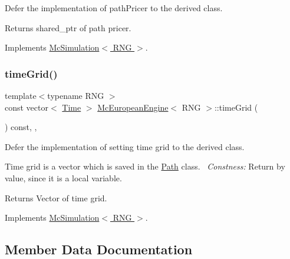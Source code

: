 Defer the implementation of path\+Pricer to the derived class. 

\begin{DoxyReturn}{Returns}
shared\+\_\+ptr of path pricer. 
\end{DoxyReturn}


Implements \hyperlink{class_mc_simulation_ae3b894a78823df7897abf418bb04a4a1}{Mc\+Simulation$<$ R\+N\+G $>$}.

\hypertarget{class_mc_european_engine_a62341229306247e5c1eed9a7d4a2dba3}{}\label{class_mc_european_engine_a62341229306247e5c1eed9a7d4a2dba3} 
\subsubsection{\texorpdfstring{time\+Grid()}{timeGrid()}}
{\footnotesize\ttfamily template$<$typename R\+NG $>$ \\
const vector$<$ \hyperlink{_name_def_8h_ac2d3e0ba793497bcca555c7c2cf64ff3}{Time} $>$ \hyperlink{class_mc_european_engine}{Mc\+European\+Engine}$<$ R\+NG $>$\+::time\+Grid (\begin{DoxyParamCaption}{ }\end{DoxyParamCaption}) const\hspace{0.3cm}{\ttfamily [override]}, {\ttfamily [private]}, {\ttfamily [virtual]}}



Defer the implementation of setting time grid to the derived class. 

Time grid is a vector which is saved in the \hyperlink{class_path}{Path} class.~\newline
{\itshape Constness\+:} Return by value, since it is a local variable. \begin{DoxyReturn}{Returns}
Vector of time grid. 
\end{DoxyReturn}


Implements \hyperlink{class_mc_simulation_a8af54a9121f2d875872295b03a1b2a40}{Mc\+Simulation$<$ R\+N\+G $>$}.



\subsection{Member Data Documentation}
\hypertarget{class_mc_european_engine_a4f951d1b93039bb0cf5e65abb1d61f2e}{}\label{class_mc_european_engine_a4f951d1b93039bb0cf5e65abb1d61f2e} 
